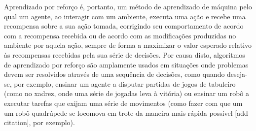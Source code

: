 \documentclass[cic,tc]{iiufrgs}
\begin{document}
%

Aprendizado por reforço é, portanto, um método de aprendizado de máquina pelo
qual um agente, ao interagir com um ambiente, executa uma ação e recebe uma
recompensa sobre a sua ação tomada, corrigindo seu comportamento de acordo com a
recompensa recebida ou de acordo com as modificações produzidas no ambiente por
aquela ação, sempre de forma a maximizar o valor esperado relativo às
recompensas recebidas pela sua série de decisões. Por causa disto, algoritmos
de aprendizado por reforço são amplamente usados em situações onde problemas
devem ser resolvidos através de uma sequência de decisões, como quando
deseja-se, por exemplo, ensinar um agente a disputar partidas de jogos de
tabuleiro (como no xadrez, onde uma série de jogadas leva à vitória) ou ensinar
um robô a executar tarefas que exijam uma série de movimentos (como fazer com
que um um robô quadrúpede se locomova em trote da maneira mais rápida possível
[add citation], por exemplo).

\end{document}
